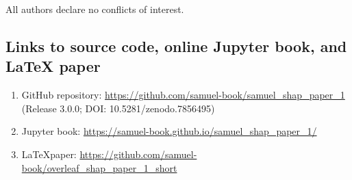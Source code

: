 All authors declare no conflicts of interest.

\subsection*{Links to source code, online Jupyter book, and LaTeX paper}
\begin{enumerate}
    \item GitHub repository: \url{https://github.com/samuel-book/samuel_shap_paper_1} (Release 3.0.0; DOI: 10.5281/zenodo.7856495)
    \item Jupyter book: \url{https://samuel-book.github.io/samuel_shap_paper_1/}
    \item \LaTeX paper: \url{https://github.com/samuel-book/overleaf_shap_paper_1_short}
\end{enumerate}
